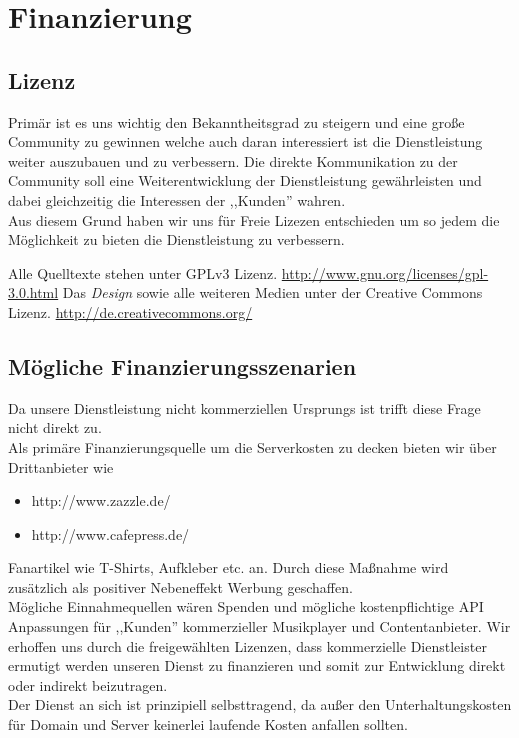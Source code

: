 \chapter{Finanzierung}

\section{Lizenz}
Primär ist es uns wichtig den Bekanntheitsgrad zu steigern und eine große
Community zu gewinnen welche auch daran interessiert ist die Dienstleistung
weiter auszubauen und zu verbessern. Die direkte Kommunikation zu der Community
soll eine Weiterentwicklung der Dienstleistung gewährleisten und dabei
gleichzeitig die Interessen der ,,Kunden'' wahren.
\\
Aus diesem Grund haben wir uns für Freie Lizezen entschieden um so jedem die
Möglichkeit zu bieten die Dienstleistung zu verbessern.

Alle Quelltexte stehen unter GPLv3 Lizenz.
\url{http://www.gnu.org/licenses/gpl-3.0.html}
Das \emph{Design} sowie alle weiteren
Medien unter der Creative Commons Lizenz.
\url{http://de.creativecommons.org/ }

\section{Mögliche Finanzierungsszenarien}
Da unsere Dienstleistung nicht kommerziellen Ursprungs ist trifft diese Frage
nicht direkt zu.
\\
Als primäre Finanzierungsquelle um die Serverkosten zu decken bieten wir über
Drittanbieter wie 

\begin{itemize}
\item http://www.zazzle.de/
\item http://www.cafepress.de/
\end{itemize}

Fanartikel wie T-Shirts, Aufkleber etc. an. Durch diese Maßnahme wird zusätzlich
als positiver Nebeneffekt Werbung geschaffen.
\\
Mögliche Einnahmequellen wären Spenden und mögliche kostenpflichtige API
Anpassungen für ,,Kunden'' kommerzieller Musikplayer und Contentanbieter. Wir
erhoffen uns durch die freigewählten Lizenzen, dass kommerzielle Dienstleister
ermutigt werden unseren Dienst zu finanzieren und somit zur Entwicklung direkt
oder indirekt beizutragen.
\\
Der Dienst an sich ist prinzipiell selbsttragend, da außer den
Unterhaltungskosten für Domain und Server keinerlei laufende Kosten anfallen sollten.
